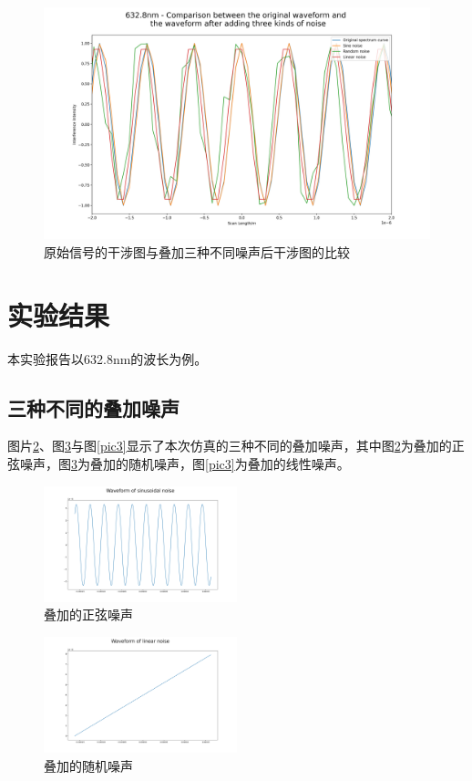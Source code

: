 \documentclass[conference]{IEEEtran}
\begin{document}
\begin{figure}[htbp]
	\centerline{
		\includegraphics[width=22cm]{pic7.png} 	
	}
	\caption{原始信号的干涉图与叠加三种不同噪声后干涉图的比较}
	\label{pic7}
\end{figure}

\section{实验结果}
本实验报告以632.8nm的波长为例。
\subsection{三种不同的叠加噪声}
图片\ref{pic1}、图\ref{pic2}与图\ref{pic3}显示了本次仿真的三种不同的叠加噪声，其中图\ref{pic1}为叠加的正弦噪声，图\ref{pic2}为叠加的随机噪声，图\ref{pic3}为叠加的线性噪声。

\begin{figure}[htbp]
    \centerline{\includegraphics[width=0.5\textwidth]{pic1.png}}
    \caption{叠加的正弦噪声}
    \label{pic1}
\end{figure}

\begin{figure}[htbp]
    \centerline{\includegraphics[width=0.5\textwidth]{pic2.png}}
    \caption{叠加的随机噪声}
    \label{pic2}
\end{figure}
\end{document}
